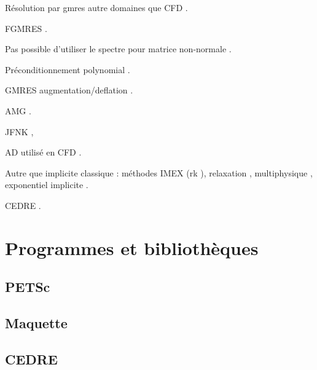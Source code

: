 Résolution par gmres autre domaines que CFD \cite{Mercier2015}.

FGMRES \cite{SimonciniSzyld2002, Pinel2010, Vasseur2016, CoulaudGiraudRametEtAl2013}.

Pas possible d'utiliser le spectre pour matrice non-normale \cite{GreenbaumStrakos1994, GreenbaumPtakStrakos1996, Trefethen1999}.

Préconditionnement polynomial \cite{DuboisGreenbaumRodrigue1979}.

GMRES augmentation/deflation \cite{ChapmanSaad1997, RamosKehlNabben, Pinel2010, Vasseur2016, Morgan2002, CoulaudGiraudRametEtAl2013}.

AMG \cite{Vasseur2016}.

JFNK \cite{LiuZhangZhongEtAl2015, Turpault2003, KnollKeyes2004},

AD \cite{Griewank2000} utilisé en CFD \cite{BilanceriBeuxElmahiEtAl2011, KenwayMaderHeEtAl2019}.

Autre que implicite classique :
méthodes IMEX (rk \cite{HuangPerssonZahr2019}),
relaxation \cite{CouletteFranckHelluyEtAl2019},
multiphysique \cite{WongKwokHorneEtAl2019},
exponentiel \cite{BhattKhaliqWade2018} implicite \cite{NieZhangZhao2006}.

CEDRE \cite{Selva1998}.

\section{Programmes et bibliothèques}
	\subsection{PETSc}
		\cite{petsc-web-page, petsc-user-ref, petsc-efficient, abhyankar2018petsc}
	\subsection{Maquette}
	\subsection{CEDRE}




\pagebreak




